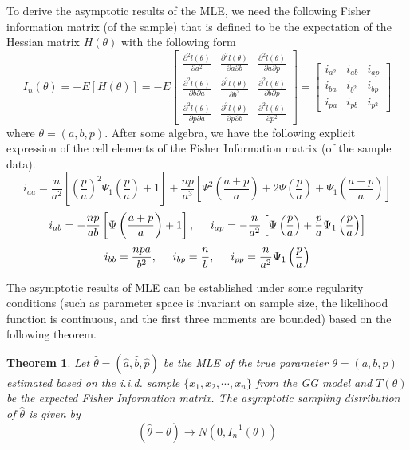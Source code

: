 \documentclass{ps}
\theoremstyle{plain}%
\newtheorem{theorem}{Theorem}[section]
\theoremstyle{definition}
\theoremstyle{remark}
\begin{document}
To derive the asymptotic results of the MLE, we need the following Fisher information matrix (of the sample) that is defined to be the expectation of the Hessian matrix $H(\theta)$ with the following form
\begin{equation}
	I_n(\theta) = -E[H(\theta)] = -E\begin{bmatrix}
		\frac{\partial^2 l(\theta)}{\partial a^2} & \frac{\partial^2 l(\theta)}{\partial a \partial b} & \frac{\partial^2 l(\theta)}{\partial a \partial p} \\
		\frac{\partial^2 l(\theta)}{\partial b\partial a} & \frac{\partial^2 l(\theta)}{\partial b^2} & \frac{\partial^2 l(\theta)}{\partial b \partial p} \\
		\frac{\partial^2 l(\theta)}{\partial p\partial a} & \frac{\partial^2 l(\theta)}{\partial p\partial b} & \frac{\partial^2 l(\theta)}{ \partial p^2}
	\end{bmatrix}
	=\begin{bmatrix}
		i_{a^2} & i_{ab} & i_{ap} \\
		i_{ba} & i_{b^2} & i_{bp} \\
		i_{pa} & i_{pb} & i_{p^2} 
	\end{bmatrix}
\end{equation}
\noindent where $\theta = (a, b, p)$. After some algebra, we have the following explicit expression of the cell elements of the Fisher Information matrix (of the sample data).
$$
i_{aa}=\frac{n}{a^2} \left[\left(\frac{p}{a}\right)^2\Psi_1\left(\frac{p}{a} \right)+1\right]
+\frac{np}{a^3}\left[\Psi^2\left(\frac{a+p}{a} \right)+2\Psi\left(\frac{p}{a}\right)+\Psi_1\left(\frac{a+p}{a} \right) \right]
$$
$$
i_{ab} =-\frac{np}{ab}\left[ \Psi\left(\frac{a+p}{a}\right) +1\right] ,\hspace{5mm}
i_{ap} = -\frac{n}{a^2}\left[ \Psi\left(\frac{p}{a} \right)+\frac{p}{a}\Psi_1\left( \frac{p}{a}\right)\right]
$$
$$
i_{bb}= \frac{npa}{b^2},  \hspace{5mm} i_{bp} =  \frac{n}{b},  \hspace{5mm} i_{pp} =  \frac{n}{a^2}\Psi_1\left( \frac{p}{a}\right)
$$

The asymptotic results of MLE can be established under some regularity conditions (such as parameter space is invariant on sample size, the likelihood function is continuous, and the first three moments are bounded) based on the following theorem. 

\begin{theorem}
	Let $\hat{\theta} = (\hat{a}, \hat{b}, \hat{p})$ be the MLE of the true parameter $\theta=(a, b, p)$ estimated based on the i.i.d. sample $\{ x_1, x_2, \cdots, x_n\}$ from the GG model and $T(\theta)$ be the expected Fisher Information matrix. The asymptotic sampling distribution of $\hat{\theta}$ is given by	
	\begin{equation}\label{asymp-dist-MLE}
		(\hat{\theta}-\theta) \to N\left(0, I_n^{-1}(\theta)\right)
	\end{equation}
\end{theorem}
\end{document}
